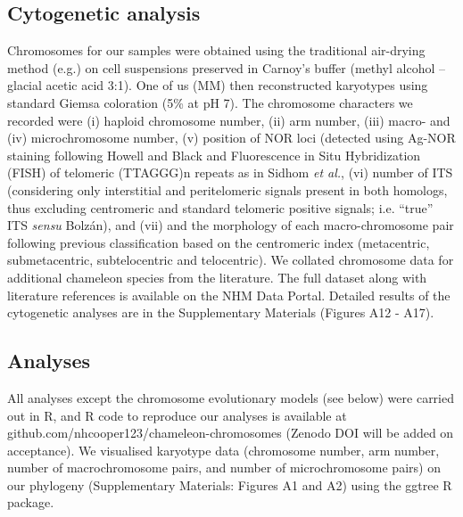 \documentclass[a4paper, 12pt]{article}
\begin{document}
\subsection{Cytogenetic analysis}
Chromosomes for our samples were obtained using the traditional air-drying method (e.g.\cite{sidhom2020karyological}) on cell suspensions preserved in Carnoy’s buffer (methyl alcohol – glacial acetic acid 3:1). 
One of us (MM) then reconstructed karyotypes using standard Giemsa coloration (5\% at pH 7). 
The chromosome characters we recorded were (i) haploid chromosome number, (ii) arm number, (iii) macro- and (iv) microchromosome number, (v) position of NOR loci (detected using Ag-NOR staining following Howell and Black\cite{howell1980controlled} and Fluorescence in Situ Hybridization (FISH) of telomeric (TTAGGG)n repeats as in Sidhom \textit{et al.}\cite{sidhom2020karyological}, (vi) number of ITS (considering only interstitial and peritelomeric signals present in both homologs, thus excluding centromeric and standard telomeric positive signals; i.e. “true” ITS \textit{sensu} Bolz\'{a}n\cite{bolzan2012chromosomal,chirino2017chromosomal}), and (vii) and the morphology of each macro-chromosome pair following previous classification based on the centromeric index (metacentric, submetacentric, subtelocentric and telocentric\cite{levan1964nomenclature}). 
We collated chromosome data for additional chameleon species from the literature. 
The full dataset along with literature references is available on the NHM Data Portal\cite{chameleon-data}.
Detailed results of the cytogenetic analyses are in the Supplementary Materials (Figures A12 - A17).

\subsection{Analyses}
All analyses except the chromosome evolutionary models (see below) were carried out in R\cite{R}, and R code to reproduce our analyses is available at github.com/nhcooper123/chameleon-chromosomes (Zenodo DOI will be added on acceptance\cite{coopercode2022}). 
We visualised karyotype data (chromosome number, arm number, number of macrochromosome pairs, and number of microchromosome pairs) on our phylogeny (Supplementary Materials: Figures A1 and A2) using the ggtree R package\cite{yu2017ggtree}.
\end{document}
